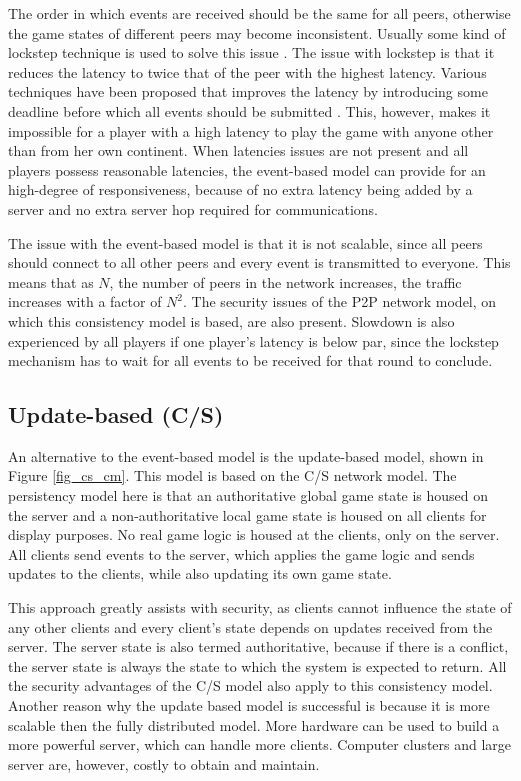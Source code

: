 The order in which events are received should be the same for all peers, otherwise the game states of different peers may become inconsistent.
Usually some kind of lockstep technique is used to solve this issue \cite{pessimistic_lock_step}. The issue with lockstep is that it reduces the
latency to twice that of the peer with the highest latency. Various techniques have been proposed that improves the latency by introducing some
deadline before which all events should be submitted \cite{cheat_proof_event_ordering}. This, however, makes it impossible for a player with a high
latency to play the game with anyone other than from her own continent. When latencies issues are not present and all players possess reasonable
latencies, the event-based model can provide for an high-degree of responsiveness, because of no extra latency being added by a server and no extra
server hop required for communications.

The issue with the event-based model is that it is not scalable, since all peers should connect to all other peers and every event is transmitted to
everyone. This means that as $N$, the number of peers in the network increases, the traffic increases with a factor of $N^2$. The security issues of
the P2P network model, on which this consistency model is based, are also present. Slowdown is also experienced by all players if one player's
latency is below par, since the lockstep mechanism has to wait for all events to be received for that round to conclude.

\subsection{Update-based (C/S)}

An alternative to the event-based model is the update-based model, shown in Figure \ref{fig_cs_cm}. This model is based on the C/S network model. The
persistency model here is that an authoritative global game state is housed on the server and a non-authoritative local game state is housed on all
clients for display purposes. No real game logic is housed at the clients, only on the server. All clients send events to the server, which applies
the game logic and sends updates to the clients, while also updating its own game state.

This approach greatly assists with security, as clients cannot influence the state of any other clients and every client's state depends on updates
received from the server. The server state is also termed authoritative, because if there is a conflict, the server state is always the state to
which the system is expected to return. All the security advantages of the C/S model also apply to this consistency model. Another reason why the
update based model is successful is because it is more scalable then the fully distributed model. More hardware can be used to build a more powerful
server, which can handle more clients. Computer clusters and large server are, however, costly to obtain and maintain.

